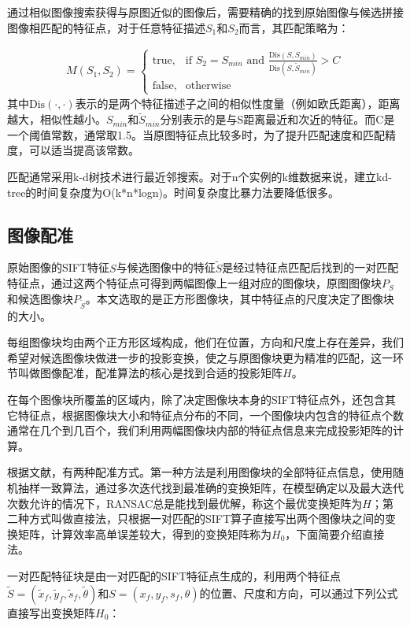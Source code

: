 \documentclass[UTF8]{csoarticle}
\begin{document}
通过相似图像搜索获得与原图近似的图像后，需要精确的找到原始图像与候选拼接图像相匹配的特征点，对于任意特征描述\(S_1\)和\(S_2\)而言，其匹配策略为：

\begin{align}
  M(S_1,S_2) = 
\begin{cases} 
\text{true}, & \mbox{if } S_2 = S_{min}\text{ and }\frac{\text{Dis}(S,S_{min})}{\text{Dis}(S,\tilde{S}_{min})} > C \\
\text{false}, & \mbox{otherwise}
\end{cases}
\end{align}
其中\(\text{Dis}(\cdot,\cdot)\)表示的是两个特征描述子之间的相似性度量（例如欧氏距离），距离越大，相似性越小。\(S_{min}\)和\(\tilde{S}_{min}\)分别表示的是与S距离最近和次近的特征。而C是一个阈值常数，通常取1.5。当原图特征点比较多时，为了提升匹配速度和匹配精度，可以适当提高该常数。

匹配通常采用k-d树技术进行最近邻搜索。对于n个实例的k维数据来说，建立kd-tree的时间复杂度为O(k*n*logn)。时间复杂度比暴力法要降低很多。

\subsection{图像配准}
原始图像的SIFT特征\(S\)与候选图像中的特征\(\tilde{S}\)是经过特征点匹配后找到的一对匹配特征点，通过这两个特征点可得到两幅图像上一组对应的图像块，原图图像块\(P_S\)和候选图像块\(P_{\tilde{S}}\)。本文选取的是正方形图像块，其中特征点的尺度决定了图像块的大小。

每组图像块均由两个正方形区域构成，他们在位置，方向和尺度上存在差异，我们希望对候选图像块做进一步的投影变换，使之与原图像块更为精准的匹配，这一环节叫做图像配准，配准算法的核心是找到合适的投影矩阵\(H\)。

在每个图像块所覆盖的区域内，除了决定图像块本身的SIFT特征点外，还包含其它特征点，根据图像块大小和特征点分布的不同，一个图像块内包含的特征点个数通常在几个到几百个，我们利用两幅图像块内部的特征点信息来完成投影矩阵的计算。

根据文献\cite{Dai:2012vn}，有两种配准方式。第一种方法是利用图像块的全部特征点信息，使用随机抽样一致算法，通过多次迭代找到最准确的变换矩阵，在模型确定以及最大迭代次数允许的情况下，RANSAC总是能找到最优解，称这个最优变换矩阵为\(H\)；第二种方式叫做直接法，只根据一对匹配的SIFT算子直接写出两个图像块之间的变换矩阵，计算效率高单误差较大，得到的变换矩阵称为\(H_0\)，下面简要介绍直接法。

一对匹配特征块是由一对匹配的SIFT特征点生成的，利用两个特征点\(\tilde{S}=(\tilde{x}_f,\tilde{y}_f,\tilde{s}_f,\tilde{\theta})\)和\(S=(x_f,y_f,s_f,\theta)\)的位置、尺度和方向，可以通过下列公式直接写出变换矩阵\(H_0\)：
\end{document}
